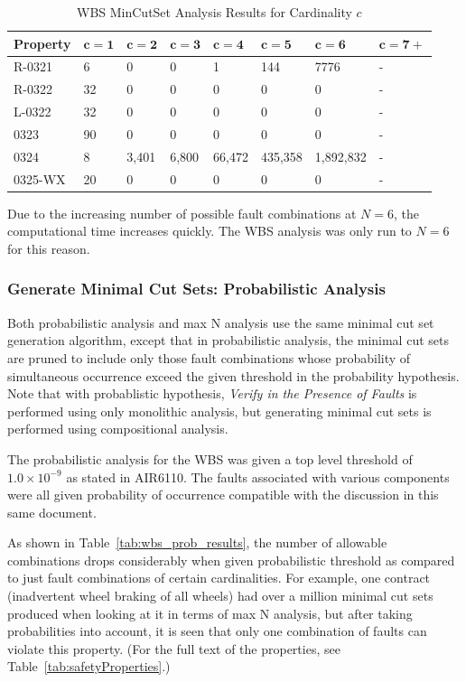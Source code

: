 \begin{center}
\begin{table}[htbp]
    \begin{tabular}{ | l | l | l | l | l | l | l | l |}
    \hline
    \textbf{Property} & $\bm{c = 1}$ & $\bm{c = 2}$ & $\bm{c = 3}$ & $\bm{c = 4}$ 
		& $\bm{c = 5}$ & $\bm{c = 6}$ & $\bm{c = 7+}$  \\ \hline \hline
    R-0321 & 6 & 0 & 0 & 1& 144&7776 &- \\ \hline
    R-0322 & 32 & 0 & 0 &0 &0 &0 &- \\ \hline
    L-0322 & 32 & 0 & 0 &0 &0 &0 &- \\ \hline
    0323 & 90 & 0 & 0 &0 &0 &0 &- \\ \hline
    0324 & 8 & 3,401 & 6,800 &66,472 & 435,358&1,892,832 &- \\ \hline
    0325-WX & 20 & 0 & 0 &0 &0 & 0&- \\ \hline
    \end{tabular}
    \caption{WBS MinCutSet Analysis Results for Cardinality $c$}
    \label{tab:wbs_maxN_results}
\end{table}
\end{center}

Due to the increasing number of possible fault combinations at $N=6$, the computational time increases quickly. The WBS analysis was only run to $N=6$ for this reason. 

\subsubsection{Generate Minimal Cut Sets: Probabilistic Analysis}
\label{sec:prob_generate}
Both probabilistic analysis and max N analysis use the same minimal cut set generation algorithm, except that in probabilistic analysis, the minimal cut sets are pruned to include only those fault combinations whose probability of simultaneous occurrence exceed the given threshold in the probability hypothesis. Note that with probablistic hypothesis, \textit{Verify in the Presence of Faults} is performed using only monolithic analysis, but generating minimal cut sets is performed using compositional analysis.


The probabilistic analysis for the WBS was given a top level threshold of $1.0 \times 10^{-9}$ as stated in AIR6110. The faults associated with various components were all given probability of occurrence compatible with the discussion in this same document. 

As shown in Table~\ref{tab:wbs_prob_results}, the number of allowable combinations drops considerably when given probabilistic threshold as compared to just fault combinations of certain cardinalities. For example, one contract (inadvertent wheel braking of all wheels) had over a million minimal cut sets produced when looking at it in terms of max N analysis, but after taking probabilities into account, it is seen that only one combination of faults can violate this property. (For the full text of the properties, see Table~\ref{tab:safetyProperties}.)

